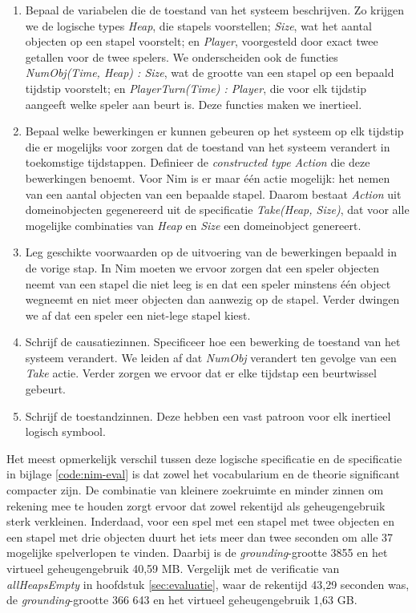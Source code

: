 \begin{enumerate}
	\item Bepaal de variabelen die de toestand van het systeem beschrijven. Zo krijgen we de logische types \textit{Heap}, die stapels voorstellen; \textit{Size}, wat het aantal objecten op een stapel voorstelt; en \textit{Player}, voorgesteld door exact twee getallen voor de twee spelers. We onderscheiden ook de functies \textit{NumObj(Time, Heap) : Size}, wat de grootte van een stapel op een bepaald tijdstip voorstelt; en \textit{PlayerTurn(Time) : Player}, die voor elk tijdstip aangeeft welke speler aan beurt is. Deze functies maken we inertieel.
	\item Bepaal welke bewerkingen er kunnen gebeuren op het systeem op elk tijdstip die er mogelijks voor zorgen dat de toestand van het systeem verandert in toekomstige tijdstappen. Definieer de \textit{constructed type Action} die deze bewerkingen benoemt. Voor Nim is er maar \'e\'en actie mogelijk: het nemen van een aantal objecten van een bepaalde stapel. Daarom bestaat \textit{Action} uit domeinobjecten gegenereerd uit de specificatie \textit{Take(Heap, Size)}, dat voor alle mogelijke combinaties van \textit{Heap} en \textit{Size} een domeinobject genereert.
	\item Leg geschikte voorwaarden op de uitvoering van de bewerkingen bepaald in de vorige stap. In Nim moeten we ervoor zorgen dat een speler objecten neemt van een stapel die niet leeg is en dat een speler minstens \'e\'en object wegneemt en niet meer objecten dan aanwezig op de stapel. Verder dwingen we af dat een speler een niet-lege stapel kiest.
	\item Schrijf de causatiezinnen. Specificeer hoe een bewerking de toestand van het systeem verandert. We leiden af dat \textit{NumObj} verandert ten gevolge van een \textit{Take} actie. Verder zorgen we ervoor dat er elke tijdstap een beurtwissel gebeurt.
	\item Schrijf de toestandzinnen. Deze hebben een vast patroon voor elk inertieel logisch symbool.
\end{enumerate}

Het meest opmerkelijk verschil tussen deze logische specificatie en de specificatie in bijlage \ref{code:nim-eval} is dat zowel het vocabularium en de theorie significant compacter zijn. De combinatie van kleinere zoekruimte en minder zinnen om rekening mee te houden zorgt ervoor dat zowel rekentijd als geheugengebruik sterk verkleinen. Inderdaad, voor een spel met een stapel met twee objecten en een stapel met drie objecten duurt het iets meer dan twee seconden om alle 37 mogelijke spelverlopen te vinden. Daarbij is de \textit{grounding}-grootte 3855 en het virtueel geheugengebruik 40,59 MB. Vergelijk met de verificatie van \textit{allHeapsEmpty} in hoofdstuk \ref{sec:evaluatie}, waar de rekentijd 43,29 seconden was, de \textit{grounding}-grootte 366 643 en het virtueel geheugengebruik 1,63 GB.

